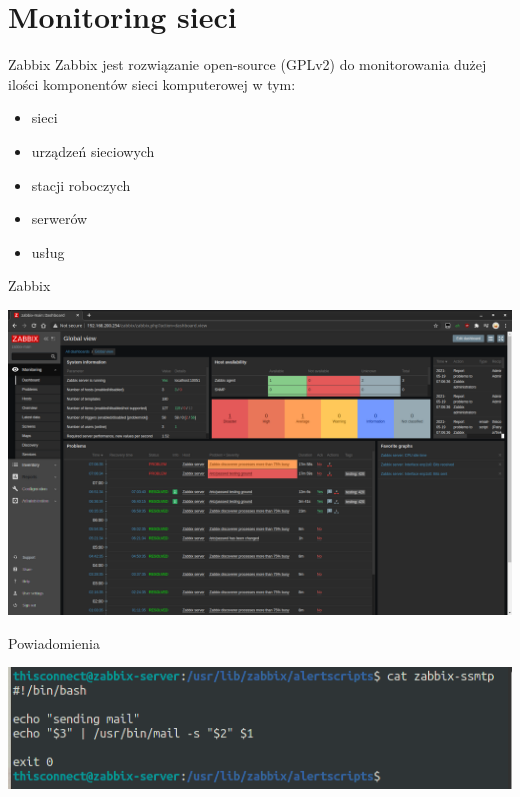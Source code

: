 \documentclass[presentation]{beamer}
\begin{document}
\section{Monitoring sieci}
\label{sec:org1c90e49}
\begin{frame}[label={sec:org98bf64b}]{Zabbix}
Zabbix jest rozwiązanie open-source (GPLv2) do monitorowania dużej ilości komponentów sieci komputerowej w tym:
\begin{itemize}
\item sieci
\item urządzeń sieciowych
\item stacji roboczych
\item serwerów
\item usług
\end{itemize}
\end{frame}
\begin{frame}[label={sec:org32ed531}]{Zabbix}
\begin{center}
\includegraphics[width=.9\linewidth]{./data/zabbix/homepage.png}
\end{center}
\end{frame}
\begin{frame}[label={sec:org91d334f}]{Powiadomienia}
\begin{center}
\includegraphics[width=.9\linewidth]{./data/zabbix/script.png}
\end{center}
\end{frame}
\end{document}
